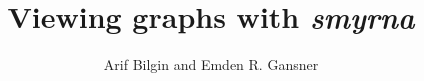 \documentclass[11pt]{article}
\author{Arif Bilgin and Emden R. Gansner}
\def\smyrna{{\it smyrna}}
\begin{document}

\title{Viewing graphs with \smyrna}
\maketitle
\newpage
\tableofcontents

\newpage





\appendix
\clearpage
 


\end{document}
